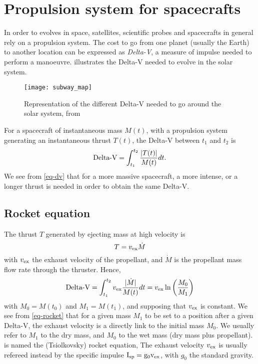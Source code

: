 


\section*{Propulsion system for spacecrafts}
\label{sec-propulsion}


In order to evolves in space, satellites, scientific probes and spacecrafts in general rely on a propulsion system.
The cost to go from one planet (usually the Earth) to another location can be expressed as \emph{ Delta-V}, a measure of impulse needed to perform a manoeuvre.
 illustrates the Delta-V needed to evolve in the solar system.
\begin{figure}[hbtp]
  \centering
  \texttt{[image: subway\_map]}
  \caption{Representation of the different Delta-V needed to go around the solar system, from \citet{reddit-subway}}
  \label{fig-subway_DV}
\end{figure}


For a spacecraft of instantaneous mass $M(t)$, with a propulsion system generating an instantaneous thrust $T(t)$, the Delta-V between $t_1$ and $t_2$ is
\begin{equation} \label{eq-dv}
  \text{Delta-V} = \int_{t_1}^{t_2} \frac{ \lvert T(t)\rvert}{M(t)} dt.
\end{equation}
We see from \cref{eq-dv} that for a more massive spacecraft, a more intense, or a longer thrust is needed in order to obtain the same Delta-V.

\subsection*{Rocket equation}
The thrust $T$ generated by ejecting mass at high velocity is
\begin{equation} \label{eq-thurst}
  T = v_{\rm ex} \dot{M}
\end{equation}
with $v_{\rm ex}$ the exhaust velocity of the propellant, and $\dot{M}$ is the propellant mass flow rate through the thruster.
Hence,
\begin{equation} \label{eq-rocket}
  \text{Delta-V} = \int_{t_1}^{t_2} v_{\rm ex} \frac{ \lvert\dot{M}\rvert}{M(t)} dt = v_{\rm ex} \ln \left( \frac{M_0}{M_1} \right)
\end{equation}
with $M_0 = M(t_0)$ and $M_1=M(t_1)$, and supposing that $v_{\rm ex}$ is constant.
We see from \cref{eq-rocket} that for a given mass $M_1$ to be set to a position after a given Delta-V, the exhaust velocity is a directly link to the initial mass $M_0$.
We usually refer to $M_1$ to the dry mass, and $M_0$ to the wet mass (dry mass plus propellant).
 is named the (Tsiolkovsky) rocket equation, 
The exhaust velocity $v_{\rm ex}$ is usually refereed instead by the specific impulse $\rm I_{\rm sp} = g_0 v_{\rm ex}$, with $g_0$ the standard gravity.

